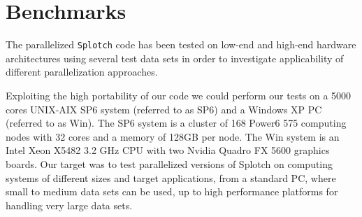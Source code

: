 \documentclass[1p,times]{elsarticle}
\begin{document}


\section{Benchmarks}

The parallelized {\tt Splotch} code has been tested on low-end and high-end hardware 
architectures using several test data sets in order to investigate applicability of
different parallelization approaches.

Exploiting the high portability of our code we could perform our tests on a 
5000 cores UNIX-AIX  SP6 system (referred to as SP6) and a Windows XP PC (referred to as Win). 
The SP6 system is a cluster of 168 Power6 575 computing nodes with 32 cores
and a memory of 128GB per node. The Win system is an Intel Xeon X5482 3.2 GHz CPU with 
two Nvidia Quadro FX 5600 graphics boards. Our target was to test parallelized
versions of Splotch on computing systems of different sizes and target applications, 
from a standard PC, where small to medium data sets can be used, up to high
performance platforms for handling very large data sets.
\end{document}
